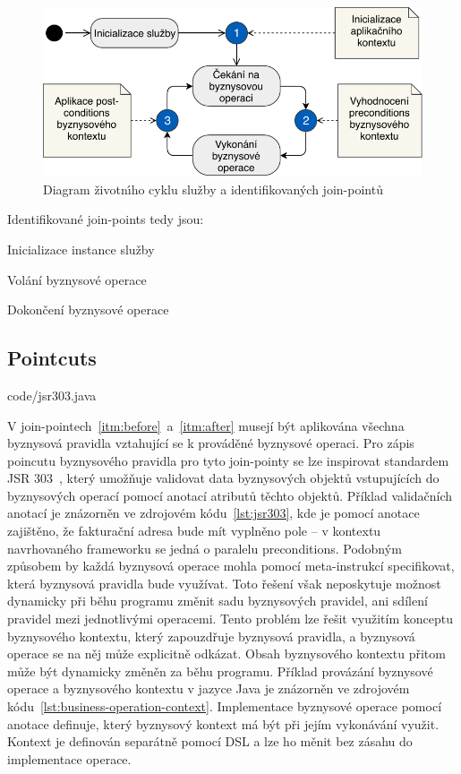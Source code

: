 \begin{figure}
    \centering
    \includegraphics[keepaspectratio=true, width=0.6\linewidth]{figures/join-points.pdf}
    \caption{Diagram životn\'{\i}ho cyklu služby a identifikovan\'ych join-pointů}
    \label{fig:join-points}
\end{figure}

Identifikované join-points tedy jsou:

\benum[label=\circledarabic]
\item\label{itm:initialization} Inicializace instance služby
\item\label{itm:before} Volání byznysové operace
\item\label{itm:after} Dokončení byznysové operace
\eenum

\subsection{Pointcuts}


{code/jsr303.java}

V join-pointech~\ref{itm:before}~a~\ref{itm:after} musejí být aplikována všechna byznysová pravidla
vztahující se k prováděné byznysové operaci.
Pro zápis poincutu byznysového pravidla pro tyto join-pointy se lze inspirovat standardem \gls{JSR}
303~\cite{bernard2009jsr}, který umožňuje validovat data byznysových objektů vstupujících do
byznysových operací pomocí anotací atributů těchto objektů. Příklad validačních anotací je znázorněn
ve zdrojovém kódu~\ref{lst:jsr303}, kde je pomocí anotace  zajištěno, že fakturační
adresa bude mít vyplněno pole  -- v kontextu navrhovaného frameworku se jedná o paralelu preconditions.
Podobným způsobem by každá byznysová operace mohla pomocí meta-instrukcí specifikovat, která byznysová
pravidla bude využívat. Toto řešení však neposkytuje možnost dynamicky při běhu programu změnit sadu
byznysových pravidel, ani sdílení pravidel mezi jednotlivými operacemi. Tento problém lze řešit využitím
konceptu byznysového kontextu, který zapouzdřuje byznysová pravidla, a byznysová operace se na něj může
explicitně odkázat. Obsah byznysového kontextu přitom může být dynamicky změněn za běhu programu. Příklad provázání
byznysové operace a byznysového kontextu v jazyce Java je znázorněn ve zdrojovém kódu~\ref{lst:business-operation-context}.
Implementace byznysové operace pomocí anotace  definuje, který byznysový kontext má být
při jejím vykonávání využit. Kontext je definován separátně pomocí \gls{DSL} a lze ho měnit bez zásahu do implementace
operace.

